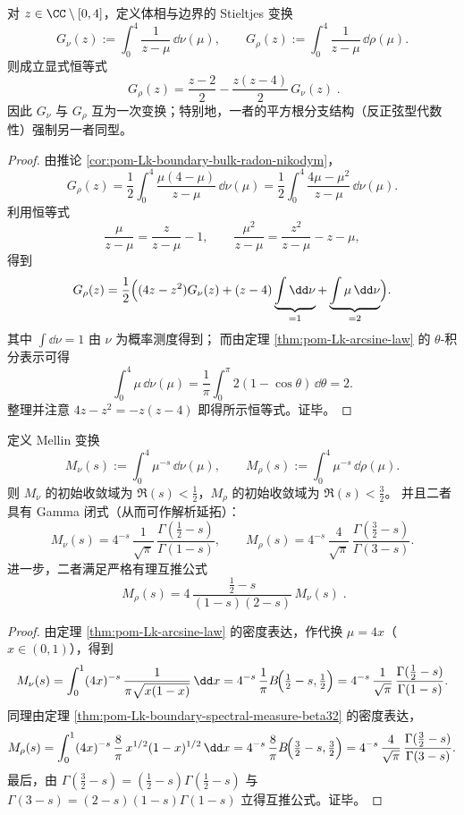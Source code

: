 \begin{corollary}\label{cor:pom-Lk-stieltjes-linear-rigidity}
对 \(z\in\CC\setminus[0,4]\)，定义体相与边界的 Stieltjes 变换
\[
G_\nu(z):=\int_{0}^{4}\frac{1}{z-\mu}\,\dd\nu(\mu),
\qquad
G_\rho(z):=\int_{0}^{4}\frac{1}{z-\mu}\,\dd\rho(\mu).
\]
则成立显式恒等式
\[
\boxed{\;
G_\rho(z)=\frac{z-2}{2}-\frac{z(z-4)}{2}\,G_\nu(z)\; }.
\]
因此 \(G_\nu\) 与 \(G_\rho\) 互为一次变换；特别地，一者的平方根分支结构（反正弦型代数性）强制另一者同型。
\end{corollary}
\begin{proof}
由推论 \ref{cor:pom-Lk-boundary-bulk-radon-nikodym}，
\[
G_\rho(z)=\frac12\int_{0}^{4}\frac{\mu(4-\mu)}{z-\mu}\,\dd\nu(\mu)
=\frac12\int_{0}^{4}\frac{4\mu-\mu^2}{z-\mu}\,\dd\nu(\mu).
\]
利用恒等式
\[
\frac{\mu}{z-\mu}=\frac{z}{z-\mu}-1,
\qquad
\frac{\mu^2}{z-\mu}=\frac{z^2}{z-\mu}-z-\mu,
\]
得到
\[
G_\rho(z)
=\frac12\Bigl((4z-z^2)G_\nu(z)+(z-4)\underbrace{\int\dd\nu}_{=1}+\underbrace{\int\mu\,\dd\nu}_{=2}\Bigr).
\]
其中 \(\int\dd\nu=1\) 由 \(\nu\) 为概率测度得到；
而由定理 \ref{thm:pom-Lk-arcsine-law} 的 \(\theta\)-积分表示可得
\[
\int_{0}^{4}\mu\,\dd\nu(\mu)
=\frac{1}{\pi}\int_{0}^{\pi}2(1-\cos\theta)\,\dd\theta
=2.
\]
整理并注意 \(4z-z^2=-z(z-4)\) 即得所示恒等式。证毕。
\end{proof}

\begin{proposition}\label{prop:pom-Lk-mellin-transform-rigidity}
定义 Mellin 变换
\[
M_\nu(s):=\int_{0}^{4}\mu^{-s}\,\dd\nu(\mu),
\qquad
M_\rho(s):=\int_{0}^{4}\mu^{-s}\,\dd\rho(\mu).
\]
则 \(M_\nu\) 的初始收敛域为 \(\Re(s)<\tfrac12\)，\(M_\rho\) 的初始收敛域为 \(\Re(s)<\tfrac32\)。
并且二者具有 Gamma 闭式（从而可作解析延拓）：
\[
M_\nu(s)=4^{-s}\,\frac{1}{\sqrt\pi}\,\frac{\Gamma(\tfrac12-s)}{\Gamma(1-s)},
\qquad
M_\rho(s)=4^{-s}\,\frac{4}{\sqrt\pi}\,\frac{\Gamma(\tfrac32-s)}{\Gamma(3-s)}.
\]
进一步，二者满足严格有理互推公式
\[
\boxed{\;
M_\rho(s)=4\,\frac{\tfrac12-s}{(1-s)(2-s)}\,M_\nu(s)\; }.
\]
\end{proposition}
\begin{proof}
由定理 \ref{thm:pom-Lk-arcsine-law} 的密度表达，作代换 \(\mu=4x\)（\(x\in(0,1)\)），得到
\[
M_\nu(s)
=\int_{0}^{1}(4x)^{-s}\,\frac{1}{\pi\sqrt{x(1-x)}}\,\dd x
=4^{-s}\,\frac{1}{\pi}B\!\Bigl(\tfrac12-s,\tfrac12\Bigr)
=4^{-s}\,\frac{1}{\sqrt\pi}\,\frac{\Gamma(\tfrac12-s)}{\Gamma(1-s)}.
\]
同理由定理 \ref{thm:pom-Lk-boundary-spectral-measure-beta32} 的密度表达，
\[
M_\rho(s)
=\int_{0}^{1}(4x)^{-s}\,\frac{8}{\pi}\,x^{1/2}(1-x)^{1/2}\,\dd x
=4^{-s}\,\frac{8}{\pi}B\!\Bigl(\tfrac32-s,\tfrac32\Bigr)
=4^{-s}\,\frac{4}{\sqrt\pi}\,\frac{\Gamma(\tfrac32-s)}{\Gamma(3-s)}.
\]
最后，由 \(\Gamma(\tfrac32-s)=(\tfrac12-s)\Gamma(\tfrac12-s)\) 与 \(\Gamma(3-s)=(2-s)(1-s)\Gamma(1-s)\) 立得互推公式。证毕。
\end{proof}
